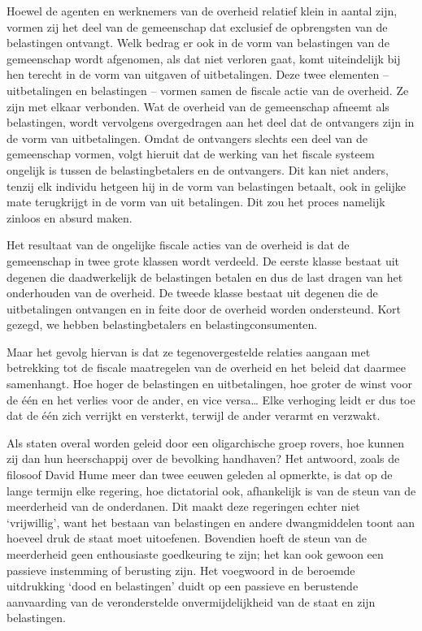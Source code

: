 \documentclass[
  a5paper,
  smalldemyvopaper,10pt,twoside,onecolumn,openright,extrafontsizes,hidelinks]{memoir}
\renewenvironment{quote}%
               {\list{}{\rightmargin=.6cm\leftmargin=.6cm}%
                \itshape \item[]}%
               {\endlist}
\begin{document}
\begin{quote}
Hoewel de agenten en werknemers van de overheid relatief klein in aantal
zijn, vormen zij het deel van de gemeenschap dat exclusief de
opbrengsten van de belastingen ontvangt. Welk bedrag er ook in de vorm
van belastingen van de gemeenschap wordt afgenomen, als dat niet
verloren gaat, komt uiteindelijk bij hen terecht in de vorm van uitgaven
of uitbetalingen. Deze twee elementen -- uitbetalingen en belastingen --
vormen samen de fiscale actie van de overheid. Ze zijn met elkaar
verbonden. Wat de overheid van de gemeenschap afneemt als belastingen,
wordt vervolgens overgedragen aan het deel dat de ontvangers zijn in de
vorm van uitbetalingen. Omdat de ontvangers slechts een deel van de
gemeenschap vormen, volgt hieruit dat de werking van het fiscale systeem
ongelijk is tussen de belastingbetalers en de ontvangers. Dit kan niet
anders, tenzij elk individu hetgeen hij in de vorm van belastingen
betaalt, ook in gelijke mate terugkrijgt in de vorm van uit betalingen.
Dit zou het proces namelijk zinloos en absurd maken.

Het resultaat van de ongelijke fiscale acties van de overheid is dat de
gemeenschap in twee grote klassen wordt verdeeld. De eerste klasse
bestaat uit degenen die daadwerkelijk de belastingen betalen en dus de
last dragen van het onderhouden van de overheid. De tweede klasse
bestaat uit degenen die de uitbetalingen ontvangen en in feite door de
overheid worden ondersteund. Kort gezegd, we hebben belastingbetalers en
belastingconsumenten.

Maar het gevolg hiervan is dat ze tegenovergestelde relaties aangaan met
betrekking tot de fiscale maatregelen van de overheid en het beleid dat
daarmee samenhangt. Hoe hoger de belastingen en uitbetalingen, hoe
groter de winst voor de één en het verlies voor de ander, en vice
versa\ldots{} Elke verhoging leidt er dus toe dat de één zich verrijkt
en versterkt, terwijl de ander verarmt en verzwakt.
\end{quote}

Als staten overal worden geleid door een oligarchische groep rovers, hoe
kunnen zij dan hun heerschappij over de bevolking handhaven? Het
antwoord, zoals de filosoof David Hume meer dan twee eeuwen geleden al
opmerkte, is dat op de lange termijn elke regering, hoe dictatorial ook,
afhankelijk is van de steun van de meerderheid van de onderdanen. Dit
maakt deze regeringen echter niet `vrijwillig', want het bestaan van
belastingen en andere dwangmiddelen toont aan hoeveel druk de staat moet
uitoefenen. Bovendien hoeft de steun van de meerderheid geen
enthousiaste goedkeuring te zijn; het kan ook gewoon een passieve
instemming of berusting zijn. Het voegwoord in de beroemde uitdrukking
`dood en belastingen' duidt op een passieve en berustende aanvaarding
van de veronderstelde onvermijdelijkheid van de staat en zijn
belastingen.
\end{document}
